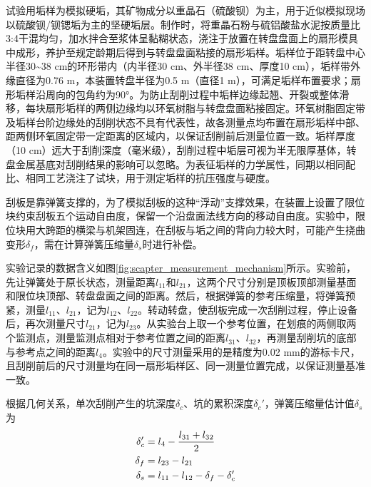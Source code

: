 试验用垢样为模拟硬垢，其矿物成分以重晶石（硫酸钡）为主，用于近似模拟现场以硫酸钡/钡锶垢为主的坚硬垢层。制作时，将重晶石粉与硫铝酸盐水泥按质量比3:4干混均匀，加水拌合至浆体呈黏糊状态，浇注于放置在转盘盘面上的扇形模具中成形，养护至规定龄期后得到与转盘盘面粘接的扇形垢样。垢样位于距转盘中心半径30\textasciitilde{}38 cm的环形带内（内半径30 cm、外半径38 cm、厚度10 cm），垢样带外缘直径为0.76 m，本装置转盘半径为0.5 m（直径1 m），可满足垢样布置要求；扇形垢样沿周向的包角约为90°。为防止刮削过程中垢样边缘起翘、开裂或整体滑移，每块扇形垢样的两侧边缘均以环氧树脂与转盘盘面粘接固定。环氧树脂固定带及垢样台阶边缘处的刮削状态不具有代表性，故各测量点均布置在扇形垢样中部、距两侧环氧固定带一定距离的区域内，以保证刮削前后测量位置一致。垢样厚度（10 cm）远大于刮削深度（毫米级），刮削过程中垢层可视为半无限厚基体，转盘金属基底对刮削结果的影响可以忽略。为表征垢样的力学属性，同期以相同配比、相同工艺浇注了试块，用于测定垢样的抗压强度与硬度。

刮板是靠弹簧支撑的，为了模拟刮板的这种“浮动”支撑效果，在装置上设置了限位块约束刮板五个运动自由度，保留一个沿盘面法线方向的移动自由度。实验中，限位块用大跨距的横梁与机架固连，在刮板与垢之间的背向力较大时，可能产生挠曲变形$\delta _f$，需在计算弹簧压缩量$\delta_s$时进行补偿。

实验记录的数据含义如图\ref{fig:scapter_measurement_mechanism}所示。实验前，先让弹簧处于原长状态，测量距离$l_{11}$和$l_{21}$，这两个尺寸分别是顶板顶部测量基面和限位块顶部、转盘盘面之间的距离。然后，根据弹簧的参考压缩量，将弹簧预紧，测量$l_{11}$、$l_{21}$，记为$l_{12}$、$l_{22}$。转动转盘，使刮板完成一次刮削过程，停止设备后，再次测量尺寸$l_{21}$，记为$l_{23}$。从实验台上取一个参考位置，在划痕的两侧取两个监测点，测量监测点相对于参考位置之间的距离$l_{31}$、$l_{32}$，再测量刮削坑的底部与参考点之间的距离$l_4$。实验中的尺寸测量采用的是精度为0.02 mm的游标卡尺，且刮削前后的尺寸测量均在同一扇形垢样区、同一测量位置完成，以保证测量基准一致。



根据几何关系，单次刮削产生的坑深度$\delta_c$、坑的累积深度$\delta_c'$，弹簧压缩量估计值$\delta_s$为
\begin{equation}
\centering
	\begin{aligned}
		\delta_c' & =l_4-\frac{l_{31}+l_{32}}{2}\\
		\delta_f & = l_{23}-l_{21}  \\ 
		\delta_s & = l_{11}-l_{12} - \delta_f- \delta_c'
	\end{aligned}
\end{equation}

